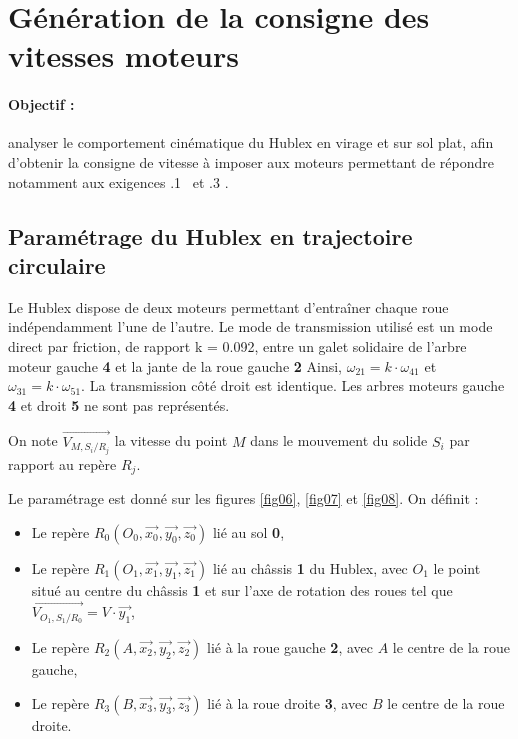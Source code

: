
\section{Génération de la consigne des vitesses moteurs}

\paragraph{Objectif :} analyser le comportement cinématique du Hublex en virage et sur sol plat, afin d'obtenir la consigne de vitesse à imposer aux moteurs permettant de répondre notamment aux exigences .1 \fg\ et .3 \fg.

\subsection{Paramétrage du Hublex en trajectoire circulaire}

Le Hublex dispose de deux moteurs permettant d'entraîner chaque roue indépendamment l'une de l'autre. Le mode de transmission utilisé est un mode direct par friction, de rapport k = 0.092, entre un galet solidaire de l'arbre moteur gauche \textbf{4} et la jante de la roue gauche \textbf{2} Ainsi, $\omega_{21}=k\cdot\omega_{41}$ et $\omega_{31}=k\cdot\omega_{51}$. La transmission côté droit est identique. Les arbres moteurs gauche \textbf{4} et droit \textbf{5} ne sont pas représentés.

On note $\overrightarrow{V_{M,S_i/R_j}}$ la vitesse du point $M$ dans le mouvement du solide $S_i$ par rapport au repère $R_j$.

Le paramétrage est donné sur les figures \ref{fig06}, \ref{fig07} et \ref{fig08}. On définit :
\begin{itemize}
 \item Le repère $R_0(O_0,\vec{x_0},\vec{y_0},\vec{z_0})$ lié au sol \textbf{0},
 \item Le repère $R_1(O_1,\vec{x_1},\vec{y_1},\vec{z_1})$ lié au châssis \textbf{1} du Hublex, avec $O_1$ le point situé au centre du châssis \textbf{1} et sur l'axe de rotation des roues tel que $\overrightarrow{V_{O_1,S_1/R_0}}= V\cdot \vec{y_1}$,
 \item Le repère $R_2(A,\vec{x_2},\vec{y_2},\vec{z_2})$ lié à la roue gauche \textbf{2}, avec $A$ le centre de la roue gauche,
 \item Le repère $R_3(B,\vec{x_3},\vec{y_3},\vec{z_3})$ lié à la roue droite \textbf{3}, avec $B$ le centre de la roue droite.
\end{itemize}


